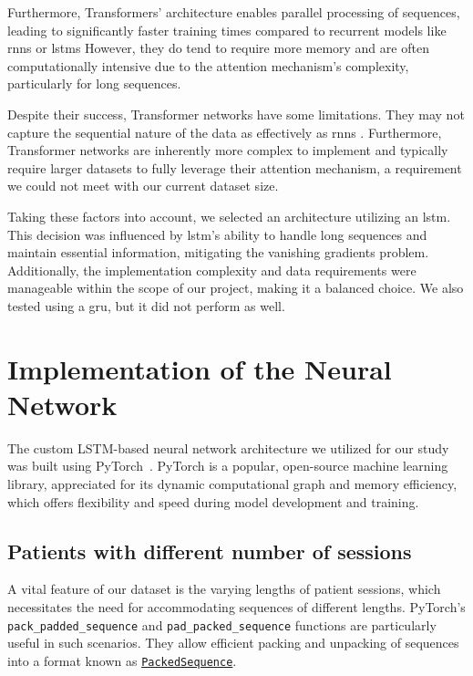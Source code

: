 Furthermore, Transformers' architecture enables parallel processing of
sequences, leading to significantly faster training times compared to recurrent
models like \glspl{rnn} or \glspl{lstm} However, they do tend to require more
memory and are often computationally intensive due to the attention mechanism's
complexity, particularly for long sequences.

Despite their success, Transformer networks have some limitations. They may not
capture the sequential nature of the data as effectively as \glspl{rnn}
\cite{rnntransformer:2022}. Furthermore, Transformer networks are inherently
more complex to implement and typically require larger datasets to fully
leverage their attention mechanism, a requirement we could not meet with our
current dataset size.

Taking these factors into account, we selected an architecture utilizing an
\gls{lstm}. This decision was influenced by \gls{lstm}'s ability to handle long
sequences and maintain essential information, mitigating the vanishing
gradients problem. Additionally, the implementation complexity and data
requirements were manageable within the scope of our project, making it a
balanced choice. We also tested using a \gls{gru}, but it did not perform as
well.

\section{Implementation of the Neural Network}

The custom LSTM-based neural network architecture we utilized for our study was
built using PyTorch~\cite{pytorch}. PyTorch is a popular, open-source machine
learning library, appreciated for its dynamic computational graph and memory
efficiency, which offers flexibility and speed during model development and
training.

\subsection{Patients with different number of sessions}

A vital feature of our dataset is the varying lengths of patient sessions,
which necessitates the need for accommodating sequences of different lengths.
PyTorch's \texttt{pack\_padded\_sequence} and \texttt{pad\_packed\_sequence}
functions are particularly useful in such scenarios. They allow efficient
packing and unpacking of sequences into a format known as
\href{https://pytorch.org/docs/stable/generated/torch.nn.utils.rnn.PackedSequence.html}{\texttt{PackedSequence}}.

